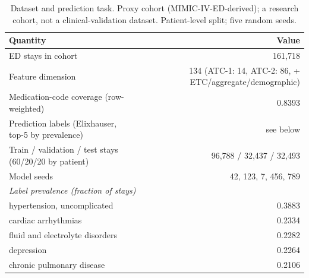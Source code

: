 \begin{table}[t]
\centering
\caption{Dataset and prediction task. Proxy cohort (MIMIC-IV-ED-derived); a research cohort, not a clinical-validation dataset. Patient-level split; five random seeds.}
\label{tab:t1_dataset_task}
\begin{tabular}{lr}
\toprule
Quantity & Value \\
\midrule
ED stays in cohort & 161,718 \\
Feature dimension & 134 (ATC-1: 14, ATC-2: 86, + ETC/aggregate/demographic) \\
Medication-code coverage (row-weighted) & 0.8393 \\
Prediction labels (Elixhauser, top-5 by prevalence) & see below \\
Train / validation / test stays (60/20/20 by patient) & 96,788 / 32,437 / 32,493 \\
Model seeds & {42, 123, 7, 456, 789} \\
\midrule
\multicolumn{2}{l}{\textit{Label prevalence (fraction of stays)}} \\
\quad hypertension, uncomplicated & 0.3883 \\
\quad cardiac arrhythmias & 0.2334 \\
\quad fluid and electrolyte disorders & 0.2282 \\
\quad depression & 0.2264 \\
\quad chronic pulmonary disease & 0.2106 \\
\bottomrule
\end{tabular}
\end{table}
